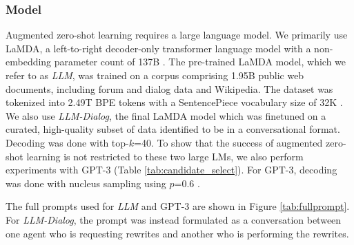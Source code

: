 \subsubsection{Model}
\label{subsection:lambda_description}
Augmented zero-shot learning requires a large language model.
We primarily use LaMDA, a left-to-right decoder-only transformer language model \citep{DBLP:journals/corr/VaswaniSPUJGKP17} with a non-embedding parameter count of 137B \citep{thoppilan2022lamda}. 
The pre-trained LaMDA model, which we refer to as \textit{LLM}, was trained on a corpus comprising 1.95B public web documents, including forum and dialog data and Wikipedia.
The dataset was tokenized into 2.49T BPE tokens with a SentencePiece vocabulary size of 32K \citep{DBLP:journals/corr/abs-1808-06226}.
We also use \textit{LLM-Dialog}, the final LaMDA model which was finetuned on a curated, high-quality subset of data identified to be in a conversational format.
Decoding was done with top-$k$=40.
To show that the success of augmented zero-shot learning is not restricted to these two large LMs, we also perform experiments with GPT-3 (Table \ref{tab:candidate_select}).
For GPT-3, decoding was done with nucleus sampling using $p$=0.6 \citep{holtzman2019curious}.

The full prompts used for \textit{LLM} and GPT-3 are shown in Figure \ref{tab:fullprompt}.
For \textit{LLM-Dialog}, the prompt was instead formulated as a conversation between one agent who is requesting rewrites and another who is performing the rewrites.



